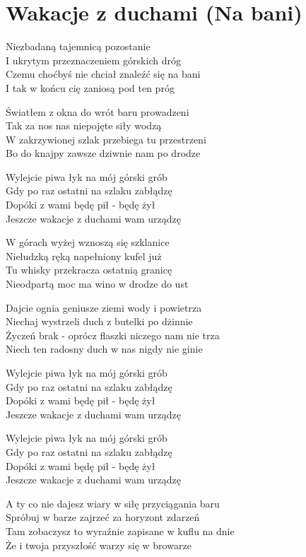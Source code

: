 \section{Wakacje z duchami (Na bani)}
\begin{text}
Niezbadaną tajemnicą pozostanie\\
I ukrytym przeznaczeniem górskich dróg\\
Czemu choćbyś nie chciał znaleźć się na bani\\
I tak w końcu cię zaniosą pod ten próg

Światłem z okna do wrót baru prowadzeni\\
Tak za nos nas niepojęte siły wodzą\\
W zakrzywionej szlak przebiega tu przestrzeni\\
Bo do knajpy zawsze dziwnie nam po drodze

\vin Wylejcie piwa łyk na mój górski grób\\
\vin Gdy po raz ostatni na szlaku zabłądzę\\
\vin Dopóki z wami będę pił - będę żył\\
\vin Jeszcze wakacje z duchami wam urządzę

W górach wyżej wznoszą się szklanice\\
Nieludzką ręką napełniony kufel już\\
Tu whisky przekracza ostatnią granicę\\
Nieodpartą moc ma wino w drodze do ust

Dajcie ognia geniusze ziemi wody i powietrza\\
Niechaj wystrzeli duch z butelki po dżinnie\\
Życzeń brak - oprócz flaszki niczego nam nie trza\\
Niech ten radosny duch w nas nigdy nie ginie

Wylejcie piwa łyk na mój górski grób\\
Gdy po raz ostatni na szlaku zabłądzę\\
Dopóki z wami będę pił - będę żył\\
Jeszcze wakacje z duchami wam urządzę

Wylejcie piwa łyk na mój górski grób\\
Gdy po raz ostatni na szlaku zabłądzę\\
Dopóki z wami będę pił - będę żył\\
Jeszcze wakacje z duchami wam urządzę

A ty co nie dajesz wiary w siłę przyciągania baru\\
Spróbuj w barze zajrzeć za horyzont zdarzeń\\
Tam zobaczysz to wyraźnie zapisane w kuflu na dnie\\
Że i twoja przyszłość warzy się w browarze
\end{text}